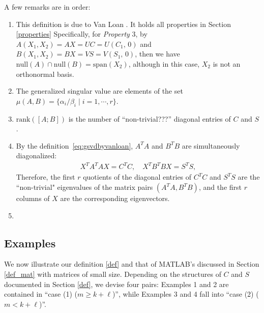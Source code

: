 \bigskip 
\noindent A few remarks are in order: 
\begin{enumerate} 
\item This definition is due to Van Loan \cite{van1976generalizing}. 
It holds all properties in Section \ref{properties} 
Specifically, for \textit{Property} 3, by 
$A(X_1, X_2) = AX = UC = U(C_1, \, 0)$ and 
$B(X_1, X_2) = BX = VS = V(S_1, \, 0)$, then we have
$\mbox{null}(A)\cap \mbox{null}(B) = \mbox{span}(X_2)$, 
although in this case, $X_2$ is not an orthonormal basis.
            
\item The generalized singular value are elements of the 
set $\mu(A,B) = \{\alpha_i/\beta_i \mid i=1, \cdots, r\}$. 
            
\item $\mbox{rank}([A; B])$ is the number of ``non-trivial???'' diagonal 
      entries of $C$ and $S$.
            
\item By the definition~\eqref{eq:gsvdbyvanloan}, $A^TA$ and $B^T B$
are simultaneously diagonalized: 
\begin{align*}
X^TA^TAX = C^TC, \quad 
X^TB^TBX = S^TS,
\end{align*}
Therefore, the first $r$ quotients of the diagonal entries 
of $C^TC$ and $S^TS$ are the ``non-trivial" eigenvalues of 
the matrix pairs $(A^TA, B^T B)$, and the first $r$ columns 
of $X$ are the corresponding eigenvectors.

\item {}
\end{enumerate} 


\newpage 
\subsection{Examples}
We now illustrate our definition \ref{def} and that of MATLAB's discussed 
in Section \ref{def_mat} with matrices of small size. Depending on the structures of $C$ 
and $S$ documented in Section \ref{def}, we devise four pairs: 
Examples 1 and 2 are contained in ``case (1) ($m \geq k+\ell$)'',
while Examples 3 and 4 fall into ``case (2) ($m < k+\ell$)''.  \label{def-eg}

